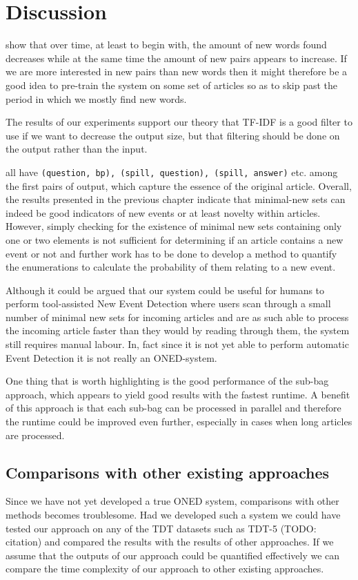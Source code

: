\chapter{Discussion}
\label{chapter:discussion}

 show that over time, at least to begin with, the amount of new words found decreases while at the same time the amount of new pairs appears to increase. If we are more interested in new pairs than new words then it might therefore be a good idea to pre-train the system on some set of articles so as to skip past the period in which we mostly find new words.

The results of our experiments support our theory that TF-IDF is a good filter to use if we want to decrease the output size, but that filtering should be done on the output rather than the input.

 all have \lstinline{(question, bp), (spill, question), (spill, answer)} etc. among the first pairs of output, which capture the essence of the original article. Overall, the results presented in the previous chapter indicate that minimal-new sets can indeed be good indicators of new events or at least novelty within articles. However, simply checking for the existence of minimal new sets containing only one or two elements is not sufficient for determining if an article contains a new event or not and further work has to be done to develop a method to quantify the enumerations to calculate the probability of them relating to a new event.

Although it could be argued that our system could be useful for humans to perform tool-assisted New Event Detection where users scan through a small number of minimal new sets for incoming articles and are as such able to process the incoming article faster than they would by reading through them, the system still requires manual labour. In, fact since it is not yet able to perform automatic Event Detection it is not really an ONED-system.

One thing that is worth highlighting is the good performance of the sub-bag approach, which appears to yield good results with the fastest runtime. A benefit of this approach is that each sub-bag can be processed in parallel and therefore the runtime could be improved even further, especially in cases when long articles are processed.

\section{Comparisons with other existing approaches}
Since we have not yet developed a true ONED system, comparisons with other methods becomes troublesome. Had we developed such a system we could have tested our approach on any of the TDT datasets such as TDT-5 (TODO: citation) and compared the results with the results of other approaches. If we assume that the outputs of our approach could be quantified effectively we can compare the time complexity of our approach to other existing approaches.

